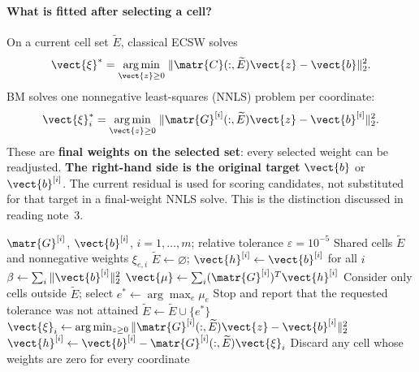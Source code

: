 \paragraph{What is fitted after selecting a cell?}
On a current cell set $\widetilde E$, classical ECSW solves
\begin{equation}
 \vect{\xi}^*=\underset{\vect{z}\geq0}{\arg\min}\;
 \|\matr{C}(:,\widetilde E)\vect{z}-\vect{b}\|_2^2.
 \label{eq:impl-classical-nnls}
\end{equation}
BM solves one nonnegative least-squares (NNLS) problem per coordinate:
\begin{equation}
 \vect{\xi}_i^*=\underset{\vect{z}\geq0}{\arg\min}\;
 \|\matr{G}^{[i]}(:,\widetilde E)\vect{z}-\vect{b}^{[i]}\|_2^2.
 \label{eq:impl-bm-nnls}
\end{equation}
These are \textbf{final weights on the selected set}: every selected weight can be readjusted. \textbf{The right-hand side is the original target} $\vect{b}$ or $\vect{b}^{[i]}$. The current residual is used for scoring candidates, not substituted for that target in a final-weight NNLS solve. This is the distinction discussed in reading note~3.

\begin{algorithm}[H]
 \caption{BM-ECSW training with a shared cell set}
 \label{alg:impl-offline}
 \small
 \begin{algorithmic}[1]
  \Require $\matr{G}^{[i]}$, $\vect{b}^{[i]}$, $i=1,\ldots,m$; relative tolerance $\varepsilon=10^{-5}$
  \Ensure Shared cells $\widetilde E$ and nonnegative weights $\xi_{e,i}$
  \State $\widetilde E\gets\varnothing$; $\vect{h}^{[i]}\gets \vect{b}^{[i]}$ for all $i$
  \State $\beta\gets\sum_i\|\vect{b}^{[i]}\|_2^2$
   \State $\vect{\mu}\gets\sum_i (\matr{G}^{[i]})^T \vect{h}^{[i]}$
   \State Consider only cells outside $\widetilde E$; select $e^*\gets\arg\max_e\mu_e$
    \State Stop and report that the requested tolerance was not attained
   \EndIf
   \State $\widetilde E\gets\widetilde E\cup\{e^*\}$
    \State $\vect{\xi}_i\gets\arg\min_{z\geq0}\|\matr{G}^{[i]}(:,\widetilde E)\vect{z}-\vect{b}^{[i]}\|_2^2$
    \State $\vect{h}^{[i]}\gets \vect{b}^{[i]}-\matr{G}^{[i]}(:,\widetilde E)\vect{\xi}_i$
   \EndFor
  \EndWhile
  \State Discard any cell whose weights are zero for every coordinate
 \end{algorithmic}
\end{algorithm}

